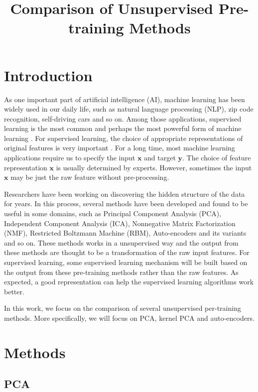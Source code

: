 \documentclass{article}
\title{Comparison of Unsupervised Pre-training Methods}
\begin{document}
%
\maketitle

\section{Introduction}
\label{sec:intro}

As one important part of artificial intelligence (AI), machine learning has been widely used in our daily life, such as natural language processing (NLP), zip code recognition, self-driving cars and so on. Among those applications, supervised learning is the most common and perhaps the most powerful form of machine learning \cite{lecun2015deep}. For supervised learning, the choice of appropriate representations of original features is very important \cite{bengio2012deep}. For a long time, most machine learning applications require us to specify the input $\pmb{x}$ and target $\pmb{y}$. The choice of feature representation $\pmb{x}$ is usually determined by experts. However, sometimes the input $\pmb{x}$ may be just the raw feature without pre-processing. 

Researchers have been working on discovering the hidden structure of the data for years. In this process, several methods have been developed and found to be useful in some domains, such as Principal Component Analysis (PCA), Independent Component Analysis (ICA), Nonnegative Matrix Factorization (NMF), Restricted Boltzmann Machine (RBM), Auto-encoders and its variants and so on. These methods works in a unsupervised way and the output from these methods are thought to be a transformation of the raw input features. For supervised learning, some supervised learning mechanism will be built based on the output from these pre-training methods rather than the raw features. As expected, a good representation can help the supervised learning algorithms work better.

In this work, we focus on the comparison of several unsupervised per-training methods. More specifically, we will focus on PCA, kernel PCA and auto-encoders.

\section{Methods}
\label{sec:method}

\subsection{PCA}
\end{document}
